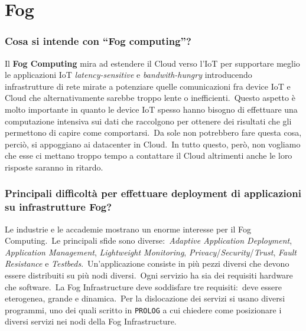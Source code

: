 \documentclass[12pt, a4paper]{article}
\begin{document}
%
\section{Fog}
\subsubsection*{Cosa si intende con ``Fog computing''?}

Il \textbf{Fog Computing} mira ad estendere il Cloud verso l'IoT per supportare meglio le applicazioni IoT \textit{latency-sensitive} e \textit{bandwith-hungry} introducendo infrastrutture di rete mirate a potenziare quelle comunicazioni fra device IoT e Cloud che alternativamente sarebbe troppo lente o inefficienti.\
Questo aspetto è molto importante in quanto le device IoT spesso hanno bisogno di effettuare una computazione intensiva sui dati che raccolgono per ottenere dei risultati che gli permettono di capire come comportarsi.\
Da sole non potrebbero fare questa cosa, perciò, si appoggiano ai datacenter in Cloud.\
In tutto questo, però, non vogliamo che esse ci mettano troppo tempo a contattare il Cloud altrimenti anche le loro risposte saranno in ritardo.

\subsubsection*{Principali difficoltà per effettuare deployment di applicazioni su infrastrutture Fog?}

Le industrie e le accademie mostrano un enorme interesse per il Fog Computing.\
Le principali sfide sono diverse:\ \textit{Adaptive Application Deployment}, \textit{Application Management}, \textit{Lightweight Monitoring}, \textit{Privacy}/\textit{Security}/\textit{Trust}, \textit{Fault Resistance} e \textit{Testbeds}.\
Un'applicazione consiste in più pezzi diversi che devono essere distribuiti su più nodi diversi.\
Ogni servizio ha sia dei requisiti hardware che software.\
La Fog Infrastructure deve soddisfare tre requisiti:\ deve essere eterogenea, grande e dinamica.\
Per la dislocazione dei servizi si usano diversi programmi, uno dei quali scritto in \texttt{PROLOG} a cui chiedere come posizionare i diversi servizi nei nodi della Fog Infrastructure.
\end{document}
